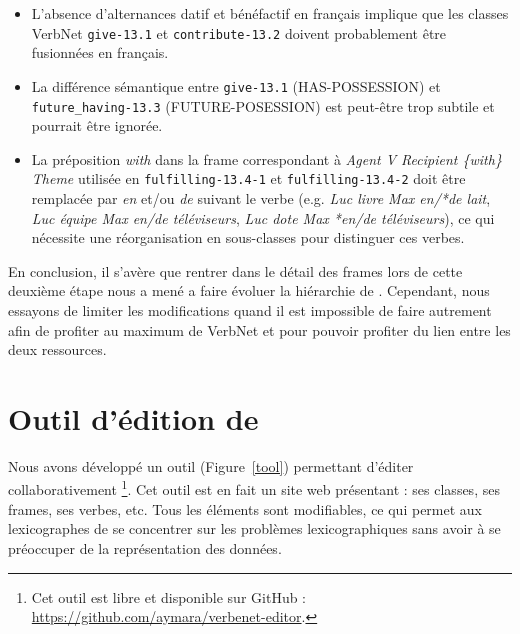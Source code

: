 \begin{itemize}
    \item L'absence d'alternances datif et bénéfactif en français implique que
        les classes VerbNet {\color{blue}\texttt{give-13.1}} et
        {\color{blue}\texttt{contribute-13.2}} doivent probablement être fusionnées en
        français.
    \item La différence sémantique entre {\color{blue}\texttt{give-13.1}}
        (HAS-POSSESSION) et {\color{blue}\texttt{future\_having-13.3}}
        (FUTURE-POSESSION) est peut-être trop subtile et pourrait être ignorée.
    \item La préposition \textit{with} dans la frame correspondant à \textit{Agent
        V Recipient \{with\} Theme} utilisée en
        {\color{blue}\texttt{fulfilling-13.4-1}} et
        {\color{blue}\texttt{fulfilling-13.4-2}} doit être remplacée par
        \textit{en} et/ou \textit{de} suivant le verbe (e.g. \textit{Luc livre Max
        en/*de lait}, \textit{Luc équipe Max en/de téléviseurs}, \textit{Luc dote
        Max *en/de téléviseurs}), ce qui nécessite une réorganisation en
        sous-classes pour distinguer ces verbes.
\end{itemize}

En conclusion, il s'avère que rentrer dans le détail des frames lors de cette
deuxième étape nous a mené a faire évoluer la hiérarchie de \verbenet{}.
Cependant, nous essayons de limiter les modifications quand il est impossible
de faire autrement afin de profiter au maximum de VerbNet et pour pouvoir
profiter du lien entre les deux ressources.

\section{Outil d'édition de \verbenet{}}\label{toolquentin}

Nous avons développé un outil (Figure~\ref{tool}) permettant d'éditer collaborativement
\verbenet{}\footnote{Cet outil est libre et disponible sur GitHub :
\url{https://github.com/aymara/verbenet-editor}.}. Cet outil est en fait un
site web présentant \verbenet{}: ses classes, ses frames, ses verbes, etc.
Tous les éléments sont modifiables, ce qui permet aux lexicographes de se
concentrer sur les problèmes lexicographiques sans avoir à se préoccuper de la
représentation des données.

